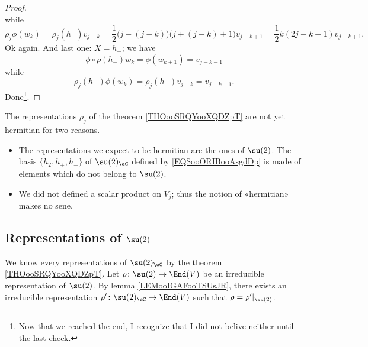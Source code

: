 \begin{proof}
\begin{equation}
    \end{equation}
    while
    \begin{equation}
        \rho_j\phi(w_k)=\rho_j(h_+)v_{j-k}=\frac{ 1 }{2}\big( j-(j-k) \big)\big( j+(j-k)+1 \big)v_{j-k+1}=\frac{ 1 }{2}k(2j-k+1)v_{j-k+1}.
    \end{equation}
    Ok again. And last one: \( X=h_-\); we have
    \begin{equation}
        \phi\circ\rho(h_-)w_k=\phi(w_{k+1})=v_{j-k-1}
    \end{equation}
    while
    \begin{equation}
        \rho_j(h_-)\phi(w_k)=\rho_j(h_-)v_{j-k}=v_{j-k-1}.
    \end{equation}
    Done\footnote{Now that we reached the end, I recognize that I did not belive neither until the last check.}.
\end{proof}

\begin{normaltext}
    The representations \( \rho_j\) of the theorem \ref{THOooSRQYooXQDZpT} are not yet hermitian for two reasons.
    \begin{itemize}
        \item The representations we expect to be hermitian are the ones of \( \su(2)\). The basis \( \{ h_2,h_{+}, h_{-} \}\) of \( \su(2)_{\eC}\) defined by \eqref{EQSooORIBooAsgdDp} is made of elements which do not belong to \( \su(2)\).
        \item We did not defined a scalar product on \( V_j\); thus the notion of «hermitian» makes no sene.
    \end{itemize}
\end{normaltext}

\subsection{Representations of \texorpdfstring{$ \su(2)$}{su(2)}}

We know every representations of \( \su(2)_{\eC}\) by the theorem \ref{THOooSRQYooXQDZpT}. Let \( \rho\colon \su(2)\to \End(V)\) be an irreducible representation of \( \su(2)\). By lemma \ref{LEMooIGAFooTSUsJR}, there exists an irreducible representation \( \rho'\colon \su(2)_{\eC}\to \End(V)\) such that \( \rho=\rho'|_{\su(2)}\).

